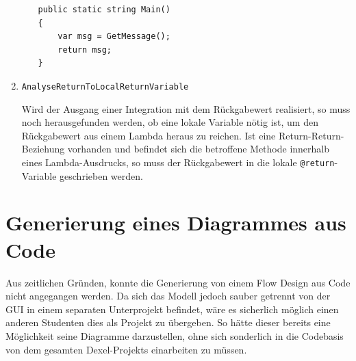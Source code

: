 \begin{enumerate}
\begin{itemize}
\begin{lstlisting}[caption=Return-Return-Beziehung]
public static string Main()
{
	var msg = GetMessage();
	return msg;
}
\end{lstlisting}		    
		    
		\end{itemize}
			\item \texttt{AnalyseReturnToLocalReturnVariable}
			
			Wird der Ausgang einer Integration mit dem Rückgabewert realisiert, so muss noch herausgefunden werden, ob eine lokale Variable nötig ist, um den Rückgabewert aus
			einem Lambda heraus zu reichen. Ist eine Return-Return-Beziehung vorhanden und befindet sich die betroffene Methode innerhalb eines Lambda-Ausdrucks, so muss der Rückgabewert in die lokale \texttt{@return}-Variable geschrieben werden.
	\end{enumerate}
	



\section{Generierung eines Diagrammes aus Code}

Aus zeitlichen Gründen, konnte die Generierung von einem Flow Design aus Code nicht angegangen werden. 
Da sich das Modell jedoch sauber getrennt von der GUI in
einem separaten Unterprojekt befindet, wäre es sicherlich möglich einen anderen
Studenten dies als Projekt zu übergeben. So hätte dieser bereits eine
Möglichkeit seine Diagramme darzustellen, ohne sich sonderlich in die
Codebasis von dem gesamten Dexel-Projekts einarbeiten zu müssen.
